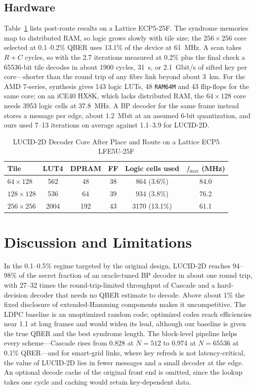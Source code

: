 \documentclass[conference]{IEEEtran}
\begin{document}
\subsection{Hardware}
Table~\ref{tab:hw} lists post-route results on a Lattice ECP5-25F. The syndrome memories map to distributed RAM, so logic grows slowly with tile size; the $256\times256$ core selected at 0.1--0.2\% QBER uses 13.1\% of the device at 61~MHz. A scan takes $R+C$ cycles, so with the 2.7 iterations measured at 0.2\% plus the final check a 65536-bit tile decodes in about 1900 cycles, 31~\textmu s, or 2.1~Gbit/s of sifted key per core---shorter than the round trip of any fibre link beyond about 3~km. For the AMD 7-series, synthesis gives 143 logic LUTs, 48 \texttt{RAM64M} and 43 flip-flops for the same core; on an iCE40 HX8K, which lacks distributed RAM, the $64\times128$ core needs 3953 logic cells at 37.8~MHz. A BP decoder for the same frame instead stores a message per edge, about 1.2~Mbit at an assumed 6-bit quantization, and ours used 7--13 iterations on average against 1.1--3.9 for LUCID-2D.

\begin{table}[t]
\caption{LUCID-2D Decoder Core After Place and Route on a Lattice ECP5 LFE5U-25F}
\label{tab:hw}
\centering
\setlength{\tabcolsep}{3.5pt}
\begin{tabular}{@{}lccccc@{}}
\toprule
Tile & LUT4 & DPRAM & FF & Logic cells used & $f_{\max}$ (MHz)\\
\midrule
$64\times128$ & 562 & 48 & 38 & 864 (3.6\%) & 84.0\\
$128\times128$ & 536 & 64 & 39 & 934 (3.8\%) & 76.2\\
$256\times256$ & 2004 & 192 & 43 & 3170 (13.1\%) & 61.1\\
\bottomrule
\end{tabular}
\end{table}

\section{Discussion and Limitations}\label{sec:discussion}
In the 0.1--0.5\% regime targeted by the original design, LUCID-2D reaches 94--98\% of the secret fraction of an oracle-tuned BP decoder in about one round trip, with 27--32 times the round-trip-limited throughput of Cascade and a hard-decision decoder that needs no QBER estimate to decode. Above about 1\% the fixed disclosure of extended-Hamming components makes it uncompetitive. The LDPC baseline is an unoptimized random code; optimized codes reach efficiencies near 1.1 at long frames \cite{elkouss2011,mao2019} and would widen its lead, although our baseline is given the true QBER and the best syndrome length. The block-level pipeline helps every scheme---Cascade rises from 0.828 at $N=512$ to 0.974 at $N=65536$ at 0.1\% QBER---and for smart-grid links, where key refresh is not latency-critical, the value of LUCID-2D lies in fewer messages and a small decoder at the edge. An optional decode cache of the original front end is omitted, since the lookup takes one cycle and caching would retain key-dependent data.
\end{document}
